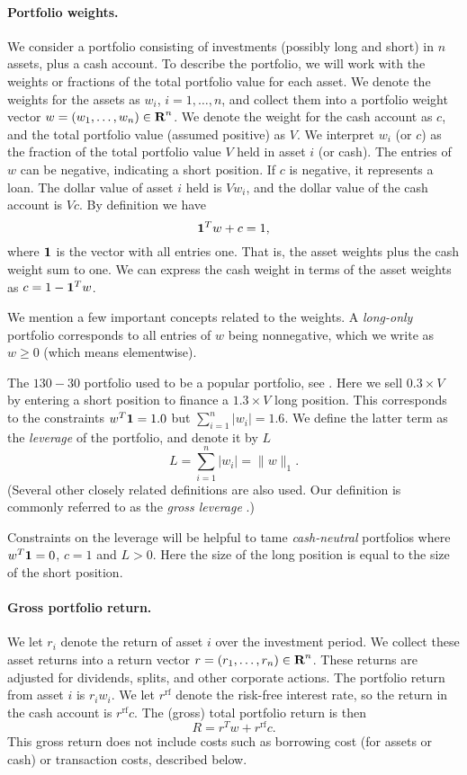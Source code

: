 \documentclass[12pt]{article}
\begin{document}
\paragraph{Portfolio weights.}
We consider a portfolio consisting of investments (possibly long and short)
in $n$ assets, plus a cash account.
To describe the portfolio, we will work with the weights or fractions
of the total portfolio value for each asset. We denote
the weights for the assets as $w_i$, $i=1, \ldots, n$, and collect them 
into a portfolio weight vector $w =(w_1, \ldots, w_n)\in {\mbox{\bf R}}^n$.
We denote the weight for the cash account as $c$, and the total
portfolio value (assumed positive) as $V$.
We interpret $w_i$ (or $c$) as the fraction of the total portfolio value $V$
held in asset $i$ (or cash).
The entries of $w$ can be negative, indicating a short position.
If $c$ is negative, it represents a loan.
The dollar value of asset $i$ held is $Vw_i$, and the dollar value of 
the cash account is $Vc$.
By definition we have 
\[
\mathbf 1^T w + c = 1,
\]
where $\mathbf 1$ is the vector
with all entries one. That is, the asset weights plus the cash weight sum to one.
We can express the cash weight in terms of the asset weights as $c=1-\mathbf 1^T w$.

We mention a few important concepts related to the weights.
A \emph{long-only} portfolio corresponds to all entries of $w$ being nonnegative,
which we write as $w \geq 0$ (which means elementwise).

The $130-30$ portfolio used to be a popular portfolio, see \cite{leibowitz2009modern}.
Here we sell $0.3 \times V$ by entering a short position to finance a $1.3 \times V$ long position.
This corresponds to the constraints $w^T \mathbf 1 = 1.0$ but $\sum_{i=1}^n |w_i| = 1.6$.
We define the latter term as the \emph{leverage} of the portfolio, and denote it by $L$
\[
L = \sum_{i=1}^n |w_i| = \|w\|_1.
\]
(Several other closely related definitions are also used. Our definition is
commonly referred to as the \emph{gross leverage} \cite{ANG2011102}.)

Constraints on the leverage will be helpful to tame \emph{cash-neutral} portfolios
where $w^T \mathbf 1 = 0$, $c=1$ and $L > 0$. Here the size of the long position is equal
to the size of the short position.

\paragraph{Gross portfolio return.}
We let $r_i$ denote the return of asset $i$ over the investment period.
We collect these asset returns into a return vector 
$r=(r_1, \ldots, r_n)\in {\mbox{\bf R}}^n$.
These returns are adjusted for dividends, splits, and other corporate 
actions.
The portfolio return from asset $i$ is $r_i w_i$.
We let $r^\mathrm{rf}$ denote the risk-free interest rate, so the return in
the cash account is $r^\mathrm{rf}c$.
The (gross) total portfolio return is then 
\[
R = r^T w + r^\mathrm{rf} c.
\]
This gross return does not include costs such as borrowing cost (for assets or 
cash) or transaction costs, described below.
\end{document}
